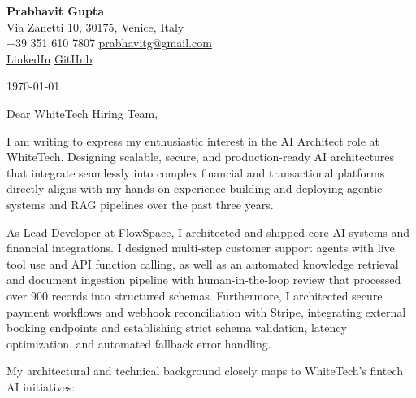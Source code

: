 \documentclass[11pt,a4paper]{article}
\begin{document}
\begin{center}
    {\huge \textbf{Prabhavit Gupta}} \\
    \vspace{4pt}
    Via Zanetti 10, 30175, Venice, Italy \\
    +39 351 610 7807 \textbar{} \href{mailto:prabhavitg@gmail.com}{prabhavitg@gmail.com} \\
    \href{https://www.linkedin.com/in/prabhavit/}{LinkedIn} \textbar{} \href{https://github.com/prab-gupta}{GitHub}
\end{center}

\vspace{14pt}

\noindent \today

\vspace{6pt}

\noindent Dear WhiteTech Hiring Team,

\vspace{6pt}

\noindent I am writing to express my enthusiastic interest in the AI Architect role at WhiteTech. Designing scalable, secure, and production-ready AI architectures that integrate seamlessly into complex financial and transactional platforms directly aligns with my hands-on experience building and deploying agentic systems and RAG pipelines over the past three years.

\noindent As Lead Developer at FlowSpace, I architected and shipped core AI systems and financial integrations. I designed multi-step customer support agents with live tool use and API function calling, as well as an automated knowledge retrieval and document ingestion pipeline with human-in-the-loop review that processed over 900 records into structured schemas. Furthermore, I architected secure payment workflows and webhook reconciliation with Stripe, integrating external booking endpoints and establishing strict schema validation, latency optimization, and automated fallback error handling.

\noindent My architectural and technical background closely maps to WhiteTech’s fintech AI initiatives:
\end{document}
